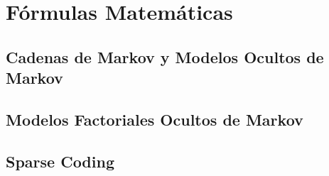 \chapter{Fórmulas Matemáticas}
\label{ch:anexob}
\section{Cadenas de Markov y Modelos Ocultos de Markov}
\section{Modelos Factoriales Ocultos de Markov}
\section{Sparse Coding}
